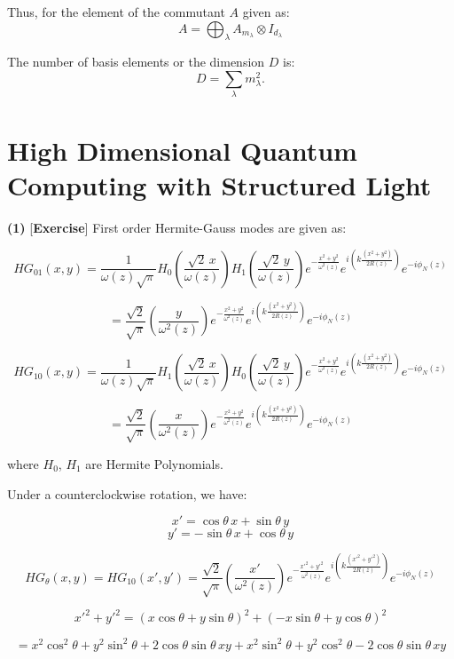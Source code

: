 \documentclass{article}
\begin{document}
Thus, for the element of the commutant \(A\) given as:
\[
A = \bigoplus_\lambda A_{m_\lambda} \otimes I_{d_\lambda}
\]

The number of basis elements or the dimension \(D\) is:
\[
D = \sum_\lambda m_\lambda^2.
\]


\section*{High Dimensional Quantum Computing with Structured Light}

\textbf{(1)} [\textbf{Exercise}] First order Hermite-Gauss modes are given as:

\[
HG_{01}(x, y) = \frac{1}{\omega(z)\sqrt{\pi}} H_0 \left( \frac{\sqrt{2} \, x}{\omega(z)} \right) H_1 \left( \frac{\sqrt{2} \, y}{\omega(z)} \right) 
e^{-\frac{x^2 + y^2}{\omega^2(z)}} e^{i \left( k \frac{(x^2 + y^2)}{2R(z)} \right)} e^{-i \phi_N(z)}
\]

\[
= \frac{\sqrt{2}}{\sqrt{\pi}} \left( \frac{y}{\omega^2(z)} \right) e^{-\frac{x^2 + y^2}{\omega^2(z)}} 
e^{i \left( k \frac{(x^2 + y^2)}{2R(z)} \right)} e^{-i \phi_N(z)}
\]

\[
HG_{10}(x, y) = \frac{1}{\omega(z)\sqrt{\pi}} H_1 \left( \frac{\sqrt{2} \, x}{\omega(z)} \right) H_0 \left( \frac{\sqrt{2} \, y}{\omega(z)} \right) 
e^{-\frac{x^2 + y^2}{\omega^2(z)}} e^{i \left( k \frac{(x^2 + y^2)}{2R(z)} \right)} e^{-i \phi_N(z)}
\]

\[
= \frac{\sqrt{2}}{\sqrt{\pi}} \left( \frac{x}{\omega^2(z)} \right) e^{-\frac{x^2 + y^2}{\omega^2(z)}} 
e^{i \left( k \frac{(x^2 + y^2)}{2R(z)} \right)} e^{-i\phi_N(z)}
\]

where $H_0$, $H_1$ are Hermite Polynomials.

Under a counterclockwise rotation, we have:

\[
x' = \cos \theta \, x + \sin \theta \, y
\]
\[
y' = -\sin \theta \, x + \cos \theta \, y
\]

\[
HG_\theta(x,y) = HG_{10}(x', y') = \frac{\sqrt{2}}{\sqrt{\pi}} \left( \frac{x'}{\omega^2(z)} \right) 
e^{-\frac{x'^2 + y'^2}{\omega^2(z)}} e^{i \left( k \frac{(x'^2 + y'^2)}{2R(z)} \right)} e^{-i \phi_N(z)}
\]

\[
x'^2 + y'^2 = \left( x \cos \theta + y \sin \theta \right)^2 + \left( -x \sin \theta + y \cos \theta \right)^2
\]

\[
= x^2 \cos^2 \theta + y^2 \sin^2 \theta + 2 \cos \theta \sin \theta \, xy 
+ x^2 \sin^2 \theta + y^2 \cos^2 \theta - 2 \cos \theta \sin \theta \, xy
\]
\end{document}
